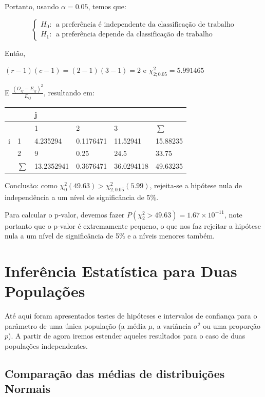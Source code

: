 \documentclass[
]{book}
\begin{document}
Portanto, usando \(\alpha=0.05\), temos que:

\[
\begin{cases}
H_0:~~\text{a preferência é independente da classificação de trabalho}\\
H_1:~~\text{a preferência depende da classificação de trabalho}
\end{cases}
\]

Então,

\((r-1)(c-1)=(2-1)(3-1)=2\) e \(\chi^2_{2;0.05}=5.991465\)

E \(\frac{(O_{ij}-E_{ij})^2}{E_{ij}}\), resultando em:

\begin{longtable}[]{@{}llllll@{}}
\toprule
& & j & & & \\
\midrule
\endhead
& & 1 & 2 & 3 & \(\sum\) \\
i & 1 & 4.235294 & 0.1176471 & 11.52941 & 15.88235 \\
& 2 & 9 & 0.25 & 24.5 & 33.75 \\
& \(\sum\) & 13.2352941 & 0.3676471 & 36.0294118 & 49.63235 \\
\bottomrule
\end{longtable}

Conclusão: como \(\chi^2_0(49.63)>\chi^2_{2;0.05}(5.99)\), rejeita-se a hipótese nula de independência a um nível de significância de 5\%.

Para calcular o p-valor, devemos fazer \(P(\chi_2^2>49.63)=1.67\times 10^{-11}\), note portanto que o p-valor é extremamente pequeno, o que nos faz rejeitar a hipótese nula a um nível de significância de 5\% e a níveis menores também.

\hypertarget{inferuxeancia-estatuxedstica-para-duas-populauxe7uxf5es}{%
\chapter{Inferência Estatística para Duas Populações}\label{inferuxeancia-estatuxedstica-para-duas-populauxe7uxf5es}}

Até aqui foram apresentados testes de hipóteses e intervalos de confiança para o parâmetro de uma única população (a média \(\mu\), a variância \(\sigma^2\) ou uma proporção \(p\)). A partir de agora iremos estender aqueles resultados para o caso de duas populações independentes.

\hypertarget{comparauxe7uxe3o-das-muxe9dias-de-distribuiuxe7uxf5es-normais}{%
\section{Comparação das médias de distribuições Normais}\label{comparauxe7uxe3o-das-muxe9dias-de-distribuiuxe7uxf5es-normais}}
\end{document}

